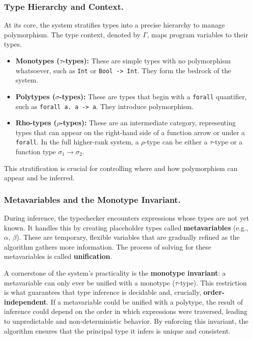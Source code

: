 \subsubsection{Type Hierarchy and Context.}
At its core, the system stratifies types into a precise hierarchy to manage polymorphism. The type context, denoted by \textbf{$\Gamma$}, maps program variables to their types.
\begin{itemize}
    \item \textbf{Monotypes ($\tau$-types):} These are simple types with no polymorphism whatsoever, such as \texttt{Int} or \texttt{Bool -> Int}. They form the bedrock of the system.
    \item \textbf{Polytypes ($\sigma$-types):} These are types that begin with a \texttt{forall} quantifier, such as \texttt{forall a. a -> a}. They introduce polymorphism.
    \item \textbf{Rho-types ($\rho$-types):} These are an intermediate category, representing types that can appear on the right-hand side of a function arrow or under a \texttt{forall}. In the full higher-rank system, a $\rho$-type can be either a $\tau$-type or a function type $\sigma_1 \rightarrow \sigma_2$.
\end{itemize}
This stratification is crucial for controlling where and how polymorphism can appear and be inferred.

\subsubsection{Metavariables and the Monotype Invariant.}
During inference, the typechecker encounters expressions whose types are not yet known. It handles this by creating placeholder types called \textbf{metavariables} (e.g., $\alpha$, \texttt{$\beta$}). These are temporary, flexible variables that are gradually refined as the algorithm gathers more information. The process of solving for these metavariables is called \textbf{unification}.

A cornerstone of the system's practicality is the \textbf{monotype invariant}: a metavariable can only ever be unified with a monotype ($\tau$-type). This restriction is what guarantees that type inference is decidable and, crucially, \textbf{order-independent}. If a metavariable could be unified with a polytype, the result of inference could depend on the order in which expressions were traversed, leading to unpredictable and non-deterministic behavior. By enforcing this invariant, the algorithm ensures that the principal type it infers is unique and consistent.

